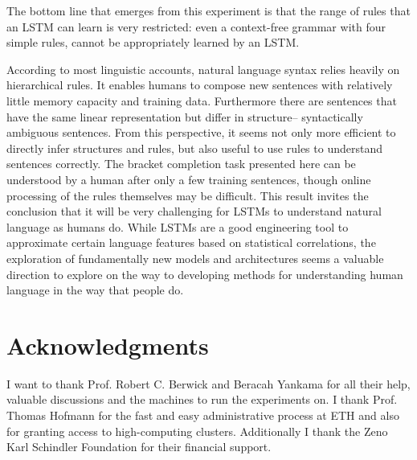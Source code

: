 \documentclass[11pt,a4paper]{article}
\begin{document}

The bottom line that emerges from this experiment is that the range of rules that an LSTM can learn is very restricted: even a context-free grammar with four simple rules, cannot be appropriately learned by an LSTM. 

According to most linguistic accounts, natural language syntax relies heavily on hierarchical rules. It enables humans to compose new sentences with relatively little memory capacity and training data. Furthermore there are sentences that have the same linear representation but differ in structure-- syntactically ambiguous sentences.  From this perspective, it seems not only more efficient to directly infer structures and rules, but also useful to use rules to understand sentences correctly. The bracket completion task presented here can be understood by a human after only a few training sentences, though online processing of the rules themselves may be difficult. This result invites the conclusion that it will be very challenging for LSTMs to understand natural language as humans do. While LSTMs are a good engineering tool to approximate certain language features based on statistical correlations, the exploration of fundamentally new models and architectures seems a valuable direction to explore on the way to developing methods for understanding human language in the way that people do.

\section*{Acknowledgments}
I want to thank Prof. Robert C. Berwick and Beracah Yankama for all their help, valuable discussions and the machines to run the experiments on. I thank Prof. Thomas Hofmann for the fast and easy administrative process at ETH and also for granting access to high-computing clusters. Additionally I thank the Zeno Karl Schindler Foundation for their financial support.



\end{document}
